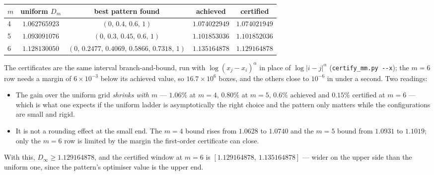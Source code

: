 \documentclass[11pt]{article}
\theoremstyle{remark}
\newcommand{\alp}{\alpha}
\begin{document}
\begin{center}\small
\begin{tabular}{lcccc}
\toprule
$m$ & uniform $D_m$ & best pattern found & achieved & certified \\
\midrule
4 & $1.062765923$ & $(0,\,0.4,\,0.6,\,1)$ & $1.074022949$ & $1.074021949$ \\
5 & $1.093091076$ & $(0,\,0.3,\,0.45,\,0.6,\,1)$ & $1.101853036$ & $1.101852036$ \\
6 & $1.128130050$ & $(0,\,0.2477,\,0.4069,\,0.5866,\,0.7318,\,1)$ & $1.135164878$ & $1.129164878$ \\
\bottomrule
\end{tabular}
\end{center}

\noindent The certificates are the same interval branch-and-bound, run with
$\log(x_j-x_i)^{\alp}$ in place of $\log|i-j|^{\alp}$ (\texttt{certify\_mm.py -{}-x}); the $m=6$ row
needs a margin of $6\times10^{-3}$ below its achieved value, so $16.7\times10^6$ boxes, and the
others close to $10^{-6}$ in under a second. Two readings:

\begin{itemize}
\item The gain over the uniform grid \emph{shrinks with $m$} --- $1.06\%$ at $m=4$, $0.80\%$ at
  $m=5$, $0.6\%$ achieved and $0.15\%$ certified at $m=6$ --- which is what one expects if the
  uniform ladder is asymptotically the right choice and the pattern only matters while the
  configurations are small and rigid.
\item It is not a rounding effect at the small end. The $m=4$ bound rises from $1.0628$ to
  $1.0740$ and the $m=5$ bound from $1.0931$ to $1.1019$; only the $m=6$ row is limited by the
  margin the first-order certificate can close.
\end{itemize}

With this, $D_\infty\ge1.129164878$, and the certified window at $m=6$ is
$[1.129164878,\ 1.135164878]$ --- wider on the upper side than the uniform one, since the pattern's
optimiser value is the upper end.
\end{document}

